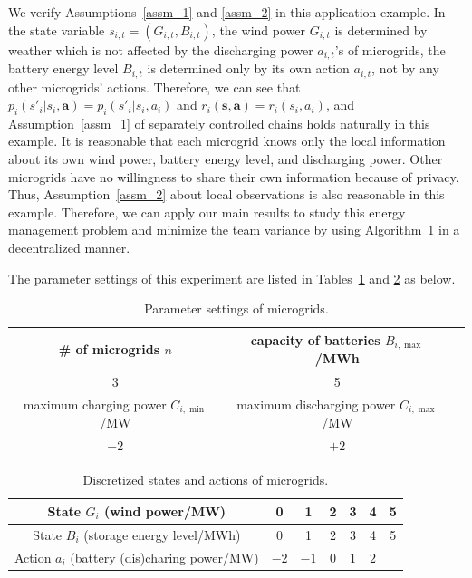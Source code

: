 \documentclass[12pt]{article}
\begin{document}
We verify Assumptions~\ref{assm_1} and \ref{assm_2} in this
application example. In the state variable
$s_{i,t}=(G_{i,t},B_{i,t})$, the wind power $G_{i,t}$ is determined
by weather which is not affected by the discharging power
$a_{i,t}$'s of microgrids, the battery energy level $B_{i,t}$ is
determined only by its own action $a_{i,t}$, not by any other
microgrids' actions. Therefore, we can see that $p_i(s'_i|s_i, \bm
a) = p_i(s'_i|s_i, a_i)$ and $r_i(\bm s,\bm a)=r_i(s_i,a_i)$, and
Assumption~\ref{assm_1} of separately controlled chains holds
naturally in this example. It is reasonable that each microgrid
knows only the local information about its own wind power, battery
energy level, and discharging power. Other microgrids have no
willingness to share their own information because of privacy. Thus,
Assumption~\ref{assm_2} about local observations is also reasonable
in this example. Therefore, we can apply our main results to study
this energy management problem and minimize the team variance by
using Algorithm~1 in a decentralized manner.


The parameter settings of this experiment are listed in
Tables~\ref{table1} and \ref{table2} as below.

\begin{table}[htbp]
    \centering
    \caption{Parameter settings of microgrids.}\label{table1}
    \begin{tabular}{ccc}
        \hline
        \toprule
        \# of microgrids $n$ & capacity of batteries $B_{i,\max}$/MWh \\ \hline
        3 & 5 \\ \hline\hline
        maximum charging power $C_{i,\min}$/MW & maximum discharging power $C_{i,\max}$/MW \\ \hline
        $-2$ & $+2$ \\ \hline\hline
    \end{tabular}
\end{table}

\begin{table}[htbp]
    \centering
    \caption{Discretized states and actions of microgrids.}\label{table2}
    \begin{tabular}{ccccccc}
        \hline
        \toprule
        State $G_i$ (wind power/MW) & 0 & 1 & 2 & 3 & 4 & 5 \\ \hline
        State $B_i$ (storage energy level/MWh) & 0 & 1 & 2 & 3 & 4 & 5 \\ \hline
        Action $a_i$ (battery (dis)charing power/MW) & $-2$ & $-1$ & 0 & $1$ & $2$  \\ \hline
    \end{tabular}
\end{table}
\end{document}
